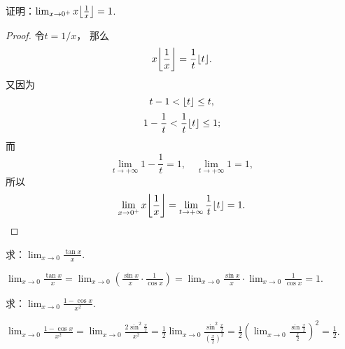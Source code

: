\begin{example}
证明：\(\lim_{x\to0^+} x \floor*{\frac1x} = 1\).
\begin{proof}
令\(t=1/x\)，
那么\[
	x \floor*{\frac1x} = \frac{1}{t} \floor{t}.
\]
又因为\[
	t - 1 < \lfloor t\rfloor \leq t,
\]\[
	1 - \frac{1}{t} < \frac{1}{t} \lfloor t\rfloor \leq 1;
\]
而\[
	\lim_{t\to+\infty} 1 - \frac{1}{t} = 1,
	\quad
	\lim_{t\to+\infty} 1 = 1,
\]
所以\[
	\lim_{x\to0^+} x \floor*{\frac1x} = \lim_{t\to+\infty} \frac{1}{t} \floor{t} = 1.
	\qedhere
\]
\end{proof}
\end{example}


\begin{example}
求：\(\lim_{x\to0} \frac{\tan x}{x}\).
\begin{solution}
\(\lim_{x\to0} \frac{\tan x}{x}
= \lim_{x\to0} \left(\frac{\sin x}{x} \cdot \frac{1}{\cos x}\right)
= \lim_{x\to0} \frac{\sin x}{x} \cdot \lim_{x\to0}\frac{1}{\cos x}
= 1\).
\end{solution}
\end{example}

\begin{example}
求：\(\lim_{x\to0} \frac{1 - \cos x}{x^2}\).
\begin{solution}
\(\lim_{x\to0} \frac{1 - \cos x}{x^2}
= \lim_{x\to0} \frac{2 \sin^2\frac{x}{2}}{x^2}
= \frac{1}{2} \lim_{x\to0} \frac{\sin^2\frac{x}{2}}{\left(\frac{x}{2}\right)^2}
= \frac{1}{2} \left(\lim_{x\to0} \frac{\sin \frac{x}{2}}{\frac{x}{2}}\right)^2
= \frac{1}{2}\).
\end{solution}
\end{example}

